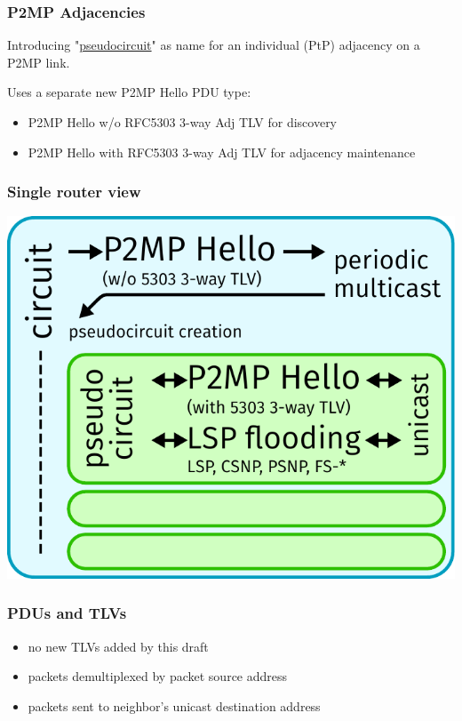 \documentclass[12pt]{beamer}
\begin{document}
\begin{frame}
  \frametitle{P2MP Adjacencies}

  Introducing "\underline{pseudocircuit}" as name for an individual (PtP) adjacency on a P2MP link.

  \vspace{5mm}

  Uses a separate new P2MP Hello PDU type:
  \begin{itemize}
    \item P2MP Hello w/o RFC5303 3-way Adj TLV for discovery
    \item P2MP Hello with RFC5303 3-way Adj TLV for adjacency maintenance
  \end{itemize}
\end{frame}

\begin{frame}
  \frametitle{Single router view}

  \includegraphics[scale=0.70,angle=0]{isis_93_p2mpmech.pdf}%
\end{frame}

\begin{frame}
  \frametitle{PDUs and TLVs}

  \begin{itemize}
    \item no new TLVs added by this draft
    \item packets demultiplexed by packet source address
    \item packets sent to neighbor's unicast destination address
  \end{itemize}
\end{frame}
\end{document}
